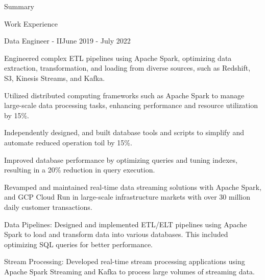 \documentclass{resume} %
\begin{document}
    \begin{rSection}{Summary}
        {}
    \end{rSection}

    \begin{rSection}{Work Experience}
                    \begin{rSubsection}
                {Data Engineer {-} II}{June 2019 - July 2022}
                                    {}
                                {}
                                    \item Engineered complex ETL pipelines using Apache Spark, optimizing data extraction, transformation, and loading from diverse sources, such as Redshift, S3, Kinesis Streams, and Kafka.
                                    \item Utilized distributed computing frameworks such as Apache Spark to manage large{-}scale data processing tasks, enhancing performance and resource utilization by 15\%.
                                    \item Independently designed, and built database tools and scripts to simplify and automate reduced operation toil by 15\%.
                                    \item Improved database performance by optimizing queries and tuning indexes, resulting in a 20\% reduction in query execution.
                                    \item Revamped and maintained real{-}time data streaming solutions with Apache Spark, and GCP Cloud Run in large{-}scale infrastructure markets with over 30 million daily customer transactions.
                                    \item Data Pipelines: Designed and implemented ETL/ELT pipelines using Apache Spark to load and transform data into various databases. This included optimizing SQL queries for better performance.
                                    \item Stream Processing: Developed real{-}time stream processing applications using Apache Spark Streaming and Kafka to process large volumes of streaming data.

\end{rSubsection}
\end{rSection}
\end{document}
